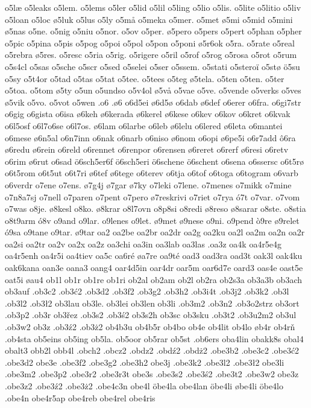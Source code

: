 {{o5læ
o5leaks
o5lem.
o5lems
o5ler
o5lid
o5lil
o5ling
o5lio
o5lis.
o5lite
o5litio
o5liv
o5loan
o5loc
ø5luk
o5lus
o5ly
o5må
o5meka
o5mer.
o5met
ø5mi
o5mid
o5mini
ø5nas
o5ne.
o5nig
o5niu
o5nor.
o5ov
o5per.
ø5pero
o5pers
o5pert
o5phan
o5pher
o5pic
o5pina
o5pis
o5pog
o5poi
o5pol
o5pon
o5poni
ø5r6ok
o5ra.
o5rate
o5real
o5rebra
ø5res.
o5resc
o5ria
o5rig.
o5rigere
o5ril
o5rof
o5rog
o5rosa
o5rot
o5rum
o5s4cl
o5sas
o5sche
o5scr
o5sed
o5selei
o5ser
o5ssem.
o5stati
o5steroï
o5stø
ö5su
o5sy
o5t4or
o5tad
o5tas
o5tat
o5tee.
o5tees
o5teg
ø5tela.
o5ten
o5ten.
o5ter
o5toa.
o5tom
ø5ty
o5un
o5undso
o5v4ol
ø5vå
o5vae
o5ve.
o5vende
o5verks
o5ves
ø5vik
o5vo.
o5vot
o5wen
.o6
.ø6
o6d5ei
ø6d5ø
o6dab
ø6def
o6erer
o6fra.
o6gi7str
o6gig
o6gista
o6isa
ø6keh
ø6kerada
ø6kerel
ø6kese
o6kev
o6kov
o6kret
o6kvak
o6l5osf
o6l7o6se
o6l7os.
ø6lam
o6larbe
o6leb
ø6lelu
o6lered
ø6leta
o6mantei
o6mese
ø6n5al
o6n7inn
o6nak
o6narb
o6niso
ø6nom
o6opi
ø6pe5i
o6r7add
ô6ra
ø6redu
ø6rein
o6reld
o6rennet
o6renpor
o6rensen
ø6reret
o6rerf
ø6resi
o6retv
o6rim
ø6rut
o6sad
ö6sch5er6f
ö6sch5eri
ö6schene
ö6schent
o6sena
o6ssersc
o6t5rø
o6t5rom
o6t5ut
o6t7ri
ø6tef
ø6tege
o6terev
o6tja
o6tof
o6toga
o6togram
o6varb
o6verdr
o7ene
o7ens.
ø7g4j
ø7gar
ø7ky
o7leki
o7lene.
o7menes
o7mikk
o7mine
o7n8a7sj
o7nell
o7paren
o7pent
o7pero
ø7reskrivi
o7riet
o7rya
ó7t
o7var.
o7vom
o7was
o8je.
ø8kesl
o8ko.
ø8krar
o8l7ovn
o8p8si
o8redi
ø8reso
ø8sarar
o8ste.
o8stia
o8t9arm
ó8v
o9and
o9lar.
o9lenes
o9let.
ø9met
ø9nese
o9ni.
o9pend
ò9re
ø9relet
ó9sa
o9tane
o9tar.
ø9tar
oa2
oa2be
oa2br
oa2dr
oa2g
oa2ku
oa2l
oa2m
oa2n
oa2r
oa2si
oa2tr
oa2v
oa2x
oa2z
oa3chi
oa3in
oa3lab
oa3las
.oa3z
oa4k
oa4r5e4g
oa4r5enh
oa4r5i
oa4tiev
oa5c
oa6ré
øa7re
oa9té
oad3
oad3ra
oad3t
oak3l
oak4ku
oak6kana
oan3e
oana3
oang4
oar4d5in
oar4dr
oar5m
oar6d7e
oard3
oas4e
oast5e
oat5i
øau4
ob1l
ob1r
ob1re
ob1ri
ob2al
ob2am
ob2l
ob2ra
ob2s3a
ob3a3b
ob3ach
ob3auf
.ob3c2
.ob3ć2
.ob3d2
.ob3f2
.ob3g2
.ob3h2
.ob3i4t
.ob3j2
.ob3k2
.ob3l
.ob3l2
.ob3ł2
ob3lau
ob3le.
ob3lei
ob3len
ob3li
.ob3m2
.ob3n2
.ob3o2strz
ob3ort
.ob3p2
.ob3r
ob3řez
.ob3s2
.ob3ś2
ob3s2h
ob3sc
ob3sku
.ob3t2
.ob3u2m2
ob3ul
.ob3w2
ob3z
.ob3ź2
.ob3ż2
ob4b3u
ob4b5r
ob4bo
ob4e
ob4lit
ob4lo
øb4r
ob4rň
.ob4sta
ob5eins
ob5ing
ob5la.
ob5oor
ob5rar
ob5st
.ob6ers
oba4lin
obakk8s
obal4
obalt3
obb2l
obb4l
.obch2
.obcz2
.obdz2
.obdź2
.obdż2
.obe3b2
.obe3c2
.obe3ć2
.obe3d2
obe3e
.obe3f2
.obe3g2
.obe3h2
obe3j
.obe3k2
.obe3l2
.obe3ł2
obe3li
.obe3m2
.obe3p2
.obe3r2
.obe3r3t
obe3s
.obe3s2
.obe3ś2
.obe3t2
.obe3w2
obe3z
.obe3z2
.obe3ź2
.obe3ż2
.obe4c3n
obe4l
öbe4la
obe4lan
öbe4li
øbe4li
öbe4lo
.obe4n
obe4r5ap
obe4reb
obe4rel
obe4ris
}}

